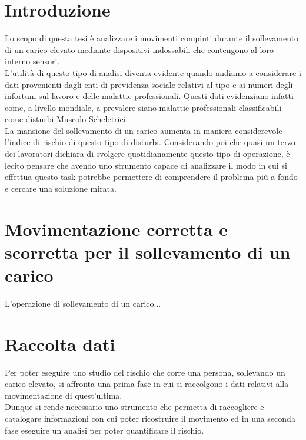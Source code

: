 \documentclass[a4paper]{article}
\begin{document}
	
	
\begin{frontespizio} 
 \Preambolo{\renewcommand{\frontpretitlefont}{\fontsize{14}{12}\scshape}}


\Rientro{1cm} 
\Punteggiatura{} 
 
\end{frontespizio}

	\tableofcontents

	\clearpage



	\section{Introduzione}
Lo scopo di questa tesi è analizzare i movimenti compiuti durante il sollevamento di un carico elevato mediante dispositivi indossabili che contengono al loro interno sensori. \\
L’utilità di questo tipo di analisi diventa evidente quando andiamo a considerare i dati provenienti dagli enti di previdenza sociale relativi al tipo e ai numeri degli infortuni sul lavoro e delle malattie professionali. Questi dati evidenziano infatti come, a livello mondiale, a prevalere siano malattie professionali classificabili come disturbi Muscolo-Scheletrici. \\
La mansione del sollevamento di un carico aumenta in maniera considerevole l'indice di rischio di questo tipo di disturbi.
Considerando poi che quasi un terzo dei lavoratori dichiara di svolgere quotidianamente questo tipo di operazione, è lecito pensare che avendo uno strumento capace di analizzare il modo in cui si effettua questo task potrebbe permettere di comprendere il problema più a fondo e cercare una soluzione mirata.

	\clearpage

	\section{Movimentazione corretta e scorretta per il sollevamento di un carico}
L'operazione di sollevamento di un carico...


	\clearpage

	\section{Raccolta dati}
Per poter eseguire uno studio del rischio che corre una persona, sollevando un carico elevato, si affronta una prima fase in cui si raccolgono i dati relativi alla movimentazione di quest'ultima. \\
Dunque si rende necessario uno strumento che permetta di raccogliere e catalogare informazioni con cui poter ricostruire il movimento ed in una seconda fase eseguire un analisi per poter quantificare il rischio. \\
\end{document}
